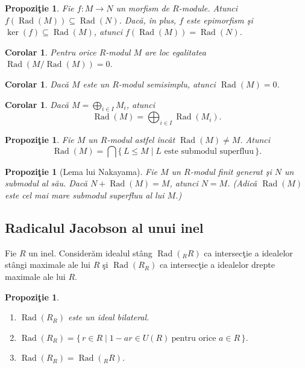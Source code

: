 \documentclass[12pt,a4paper]{book}
\DeclareMathOperator{\Rad}{Rad}
\theoremstyle{plain}
\newtheorem{proposition}[theorem]{Propoziţie}
\newtheorem{corollary}[theorem]{Corolar}
\theoremstyle{definition}
\theoremstyle{remark}
\begin{document}
\begin{proposition}
Fie \(f : M \to N\) un morfism de \(R\)-module. Atunci
\(f(\Rad(M)) \subseteq \Rad(N)\). Dacă, în plus, \(f\) este epimorfism şi
\(\ker(f) \subseteq \Rad(M)\), atunci \(f(\Rad(M)) = \Rad(N)\).
\end{proposition}

\begin{corollary}
Pentru orice \(R\)-modul \(M\) are loc egalitatea
\(\Rad(M/\Rad(M)) = 0\).
\end{corollary}

\begin{corollary}
Dacă \(M\) este un \(R\)-modul semisimplu, atunci \(\Rad(M)=0\).
\end{corollary}

\begin{corollary}
Dacă \(M = \bigoplus_{i\in I} M_i\), atunci
\[
  \Rad(M) = \bigoplus_{i\in I} \Rad(M_i).
\]
\end{corollary}

\begin{proposition}
Fie \(M\) un \(R\)-modul astfel încât \(\Rad(M)\ne M\).
Atunci
\[
  \Rad(M)
  = \bigcap \{\,L \le M \mid L \text{ este submodul superfluu}\,\}.
\]
\end{proposition}

\begin{proposition}[Lema lui Nakayama]
Fie \(M\) un \(R\)-modul finit generat şi \(N\) un submodul al său.
Dacă \(N + \Rad(M) = M\), atunci \(N = M\). (Adică \(\Rad(M)\) este
cel mai mare submodul superfluu al lui \(M\).)
\end{proposition}

\subsection*{Radicalul Jacobson al unui inel}

Fie \(R\) un inel. Considerăm idealul stâng
\(\Rad({}_R R)\) ca intersecţie a idealelor stângi maximale ale lui \(R\)
şi \(\Rad(R_R)\) ca intersecţie a idealelor drepte maximale ale lui \(R\).

\begin{proposition}
\leavevmode
\begin{enumerate}
  \item \(\Rad(R_R)\) este un ideal bilateral.
  \item \(\Rad(R_R) = \{\,r \in R \mid 1-ar \in U(R)\ \text{pentru orice } a \in R\,\}\).
  \item \(\Rad(R_R) = \Rad({}_R R)\).
\end{enumerate}
\end{proposition}
\end{document}
